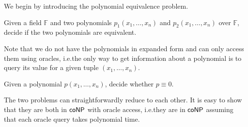 
We begin by introducing the polynomial equivalence problem.

\begin{definition} Given a field $\mathbb{F}$ and two polynomials $p_1 (x_1, \ldots, x_n)$ and $p_2 (x_1, \ldots, x_n)$ over $\mathbb{F}$, decide if the two polynomials are equivalent.
\end{definition}

Note that we do not have the polynomials in expanded form and can only access them using oracles, i.e.\@ the only way to get information about a polynomial is to query its value for a given tuple $(x_1, \ldots, x_n)$. 

\begin{definition}
Given a polynomial $p(x_1, \ldots, x_n)$, decide whether $p \equiv 0$.
\end{definition}

The two problems can straightforwardly reduce to each other. It is easy to show that they are both in $\mathsf{coNP}$ with oracle access, i.e.\@ they are in $\mathsf{coNP}$ assuming that each oracle query takes polynomial time.

